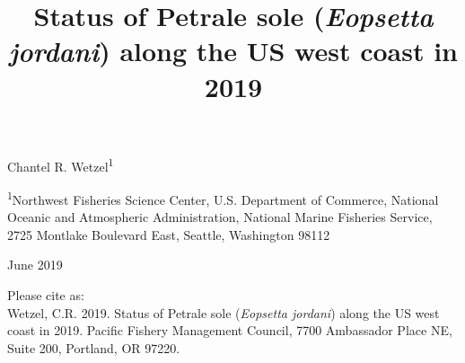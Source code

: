 \documentclass[12pt,]{article}
\title{Status of Petrale sole (\emph{Eopsetta jordani}) along the US west coast
in 2019}
\author{}
\date{}
\begin{document}
\maketitle


\begin{center}
\thispagestyle{empty}


\vspace{.5cm}




Chantel R. Wetzel\textsuperscript{1}\\


\vspace{.5cm}

\small
\textsuperscript{1}Northwest Fisheries Science Center, U.S. Department of Commerce, National Oceanic and Atmospheric Administration, National Marine Fisheries Service, 2725 Montlake Boulevard East, Seattle, Washington 98112\\

\vspace{.3cm}





\vspace{1cm}

\vfill
June 2019


\vspace{.3cm}

\newpage

\vspace{3cm}

Please cite as:\\

Wetzel, C.R. 2019. Status of Petrale sole (\textit{Eopsetta jordani}) along the US west coast in 2019. Pacific Fishery Management Council, 7700 Ambassador Place NE, Suite 200, Portland, OR 97220. 

\vspace{3cm}

\maketitle






\setcounter{page}{1}
\end{center}
\end{document}

